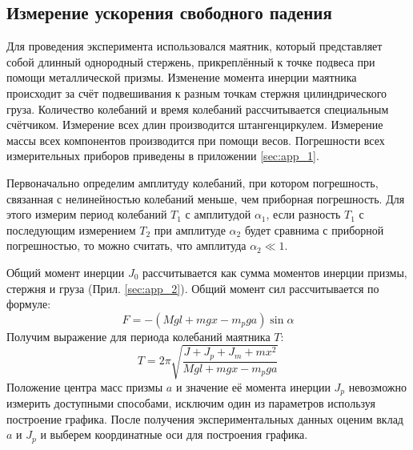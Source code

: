 \documentclass[12pt]{article}
\begin{document}
\subsection{Измерение ускорения свободного падения}
Для проведения эксперимента использовался маятник, который представляет собой длинный однородный стержень, прикреплённый к точке подвеса
при помощи металлической призмы. Изменение момента инерции маятника происходит за счёт подвешивания к разным точкам стержня цилиндрического
груза. Количество колебаний и время колебаний рассчитывается специальным счётчиком. Измерение всех длин производится штангенциркулем. Измерение
массы всех компонентов производится при помощи весов. Погрешности всех измерительных приборов приведены в приложении \ref{sec:app_1}.



Первоначально определим амплитуду колебаний, при котором погрешность, связанная с нелинейностью колебаний меньше, чем приборная погрешность.
Для этого измерим период колебаний $T_1$ с амплитудой $\alpha_1$, если разность $T_1$ с последующим измерением $T_2$ при амплитуде $\alpha_2$
будет сравнима с приборной погрешностью, то можно считать, что амплитуда $\alpha_2 \ll 1$.

Общий момент инерции $J_0$ рассчитывается как сумма моментов инерции призмы, стержня и груза (Прил. \ref{sec:app_2}). Общий момент
сил рассчитывается по формуле:
\begin{equation}\label{eq:4}
    F = -(Mgl + mgx - {m_p}ga)\sin{\alpha}
\end{equation}
Получим выражение для периода колебаний маятника $T$:
\begin{equation}\label{eq:8}
    T = 2\pi\sqrt{\frac{J + J_p + J_m + mx^2}{Mgl + mgx - {m_p}ga}}
\end{equation}
Положение центра масс призмы $a$ и значение её момента инерции $J_p$ невозможно измерить доступными способами, исключим один из параметров
используя построение графика. После получения экспериментальных данных оценим вклад $a$ и $J_p$ и выберем координатные оси для построения 
графика.
\end{document}
